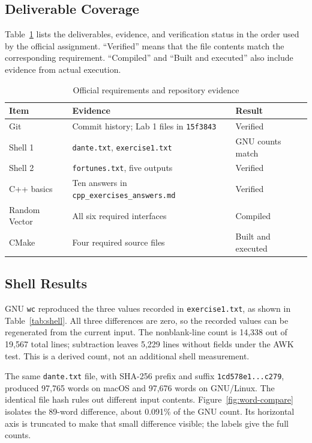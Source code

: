 \documentclass[letterpaper,10pt,conference]{ieeeconf}
\begin{document}
\subsection{Deliverable Coverage}

Table~\ref{tab:coverage} lists the deliverables, evidence, and verification status in the order used by the official assignment. ``Verified'' means that the file contents match the corresponding requirement. ``Compiled'' and ``Built and executed'' also include evidence from actual execution.

\begin{table}[t]
\caption{Official requirements and repository evidence}
\label{tab:coverage}
\centering
\footnotesize
\begin{tabular}{p{}p{}p{}}
\toprule
Item & Evidence & Result \\
\midrule
Git & Commit history; Lab 1 files in \texttt{15f3843} & Verified \\
Shell 1 & \texttt{dante.txt}, \texttt{exercise1.txt} & GNU counts match \\
Shell 2 & \texttt{fortunes.txt}, five outputs & Verified \\
C++ basics & Ten answers in \texttt{cpp\_exercises\_answers.md} & Verified \\
Random Vector & All six required interfaces & Compiled \\
CMake & Four required source files & Built and executed \\
\bottomrule
\end{tabular}
\end{table}

\subsection{Shell Results}

GNU \texttt{wc} reproduced the three values recorded in \texttt{exercise1.txt}, as shown in Table~\ref{tab:shell}. All three differences are zero, so the recorded values can be regenerated from the current input. The nonblank-line count is 14,338 out of 19,567 total lines; subtraction leaves 5,229 lines without fields under the AWK test. This is a derived count, not an additional shell measurement.

The same \texttt{dante.txt} file, with SHA-256 prefix and suffix \texttt{1cd578e1...c279}, produced 97,765 words on macOS and 97,676 words on GNU/Linux. The identical file hash rules out different input contents. Figure~\ref{fig:word-compare} isolates the 89-word difference, about 0.091\% of the GNU count. Its horizontal axis is truncated to make that small difference visible; the labels give the full counts.
\end{document}
